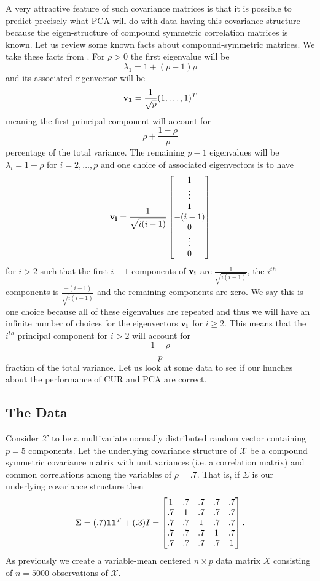 \documentclass{book}
\newcommand{\bs}[1]{\boldsymbol{#1}}
\newcommand{\rv}[1]{\bs{\mathscr{#1}}}
\begin{document}
A very attractive feature of such covariance matrices is that it is possible to predict precisely what PCA will do with data having this covariance structure because the eigen-structure of compound symmetric correlation matrices is known. Let us review some known facts about compound-symmetric matrices. We take these facts from \cite{johnson}. For $\rho>0$ the first eigenvalue will be 
$$
\lambda_1=1+(p-1)\rho
$$ 
and its associated eigenvector will be 
$$
{\bf v_1}=\frac{1}{\sqrt{p}}(1,\ldots,1)^T
$$
meaning the first principal component will account for 
$$
\rho+\frac{1-\rho}{p}
$$ 
percentage of the total variance. The remaining $p-1$ eigenvalues will be $\lambda_{i}=1-\rho$ for $i=2,\ldots,p$ and one choice of associated eigenvectors is to have
$$
{\bf v_i}=\frac{1}{\sqrt{i(i-1)}}
\begin{bmatrix}
1\\
\vdots\\
1\\
-(i-1)\\
0\\
\vdots\\
0
\end{bmatrix}
$$
for $i>2$ such that the first $i-1$ components of ${\bf v_i}$ are $\frac{1}{\sqrt{i(i-1)}}$, the $i^{th}$ components is $\frac{-(i-1)}{\sqrt{i(i-1)}}$ and the remaining components are zero. We say this is one choice because all of these eigenvalues are repeated and thus we will have an infinite number of choices for the eigenvectors ${\bf v_i}$ for $i\geq2$. This means that the $i^{th}$ principal component for $i>2$ will account for 
$$
\frac{1-\rho}{p}
$$ 
fraction of the total variance. Let us look at some data to see if our hunches about the performance of CUR and PCA are correct. 

\subsection{The Data}

Consider $\rv{X}$ to be a multivariate normally distributed random vector containing $p=5$ components. Let the underlying covariance structure of $\rv{X}$ be a compound symmetric covariance matrix with unit variances (i.e. a correlation matrix) and common correlations among the variables of $\rho=.7$. That is, if $\Sigma$ is our underlying covariance structure then
$$
\Sigma=
(.7){\bf 1}{\bf 1}^T+(.3)I=\begin{bmatrix}
1& .7& .7& .7& .7\\
.7& 1& .7& .7& .7\\
.7& .7& 1& .7& .7\\
.7& .7& .7& 1& .7\\
.7& .7& .7& .7& 1
\end{bmatrix}.
$$
As previously we create a variable-mean centered $n \times p$ data matrix $X$ consisting of $n=5000$ observations of $\rv{X}$. 
\end{document}
